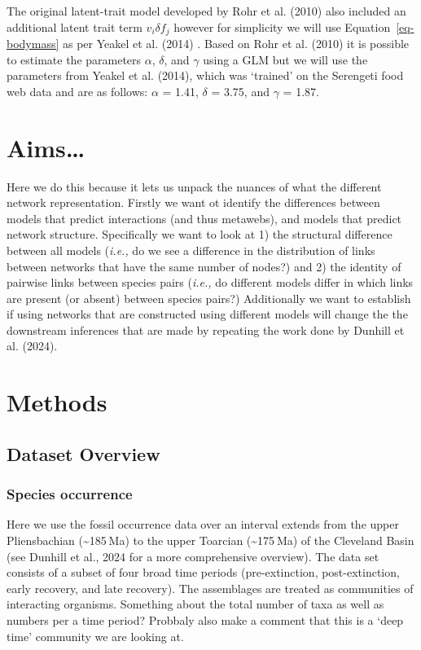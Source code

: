 \documentclass[
]{article}
\begin{document}
The original latent-trait model developed by Rohr et al. (2010) also
included an additional latent trait term \(v_{i} \delta f_{j}\) however
for simplicity we will use Equation~\ref{eq-bodymass} as per Yeakel et
al. (2014) . Based on Rohr et al. (2010) it is possible to estimate the
parameters \(\alpha\), \(\delta\), and \(\gamma\) using a GLM but we
will use the parameters from Yeakel et al. (2014), which was `trained'
on the Serengeti food web data and are as follows: \(\alpha\) = 1.41,
\(\delta\) = 3.75, and \(\gamma\) = 1.87.

\section{Aims\ldots{}}\label{aims}

Here we do this because it lets us unpack the nuances of what the
different network representation. Firstly we want ot identify the
differences between models that predict interactions (and thus
metawebs), and models that predict network structure. Specifically we
want to look at 1) the structural difference between all models
(\emph{i.e.,} do we see a difference in the distribution of links
between networks that have the same number of nodes?) and 2) the
identity of pairwise links between species pairs (\emph{i.e.,} do
different models differ in which links are present (or absent) between
species pairs?) Additionally we want to establish if using networks that
are constructed using different models will change the the downstream
inferences that are made by repeating the work done by Dunhill et al.
(2024).

\section{Methods}\label{methods}

\subsection{Dataset Overview}\label{dataset-overview}

\subsubsection{Species occurrence}\label{species-occurrence}

Here we use the fossil occurrence data over an interval extends from the
upper Pliensbachian (\textasciitilde185 Ma) to the upper Toarcian
(\textasciitilde175 Ma) of the Cleveland Basin (see Dunhill et al., 2024
for a more comprehensive overview). The data set consists of a subset of
four broad time periods (pre-extinction, post-extinction, early
recovery, and late recovery). The assemblages are treated as communities
of interacting organisms. Something about the total number of taxa as
well as numbers per a time period? Probbaly also make a comment that
this is a `deep time' community we are looking at.
\end{document}
